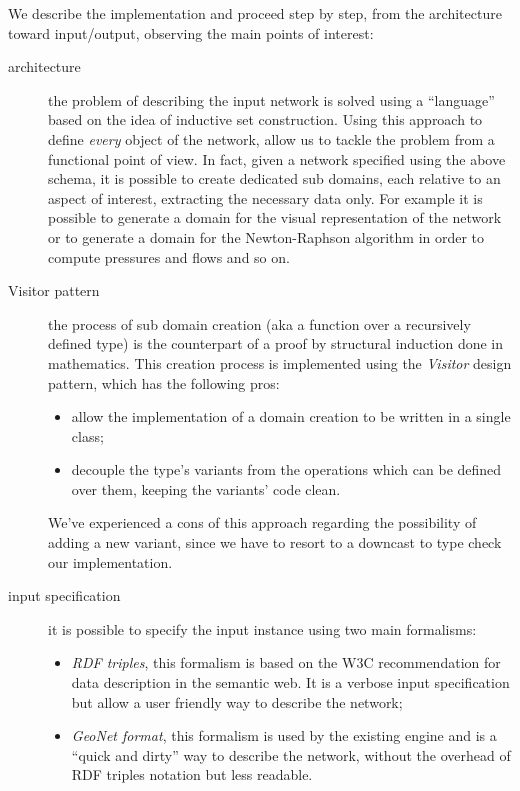 \documentclass[twoside,openright,titlepage,fleqn,
headinclude,11pt,a4paper,BCOR5mm,footinclude ]{scrbook}
\begin{document}
We describe the implementation and proceed step by step, from the architecture
toward input/output, observing the main points of interest:
\begin{description}
\item[architecture] the problem of describing the input network is solved using
a ``language'' based on the idea of inductive set construction. 
Using this approach to define \emph{every} object of the network,
allow us to tackle the problem from a functional point of view. In fact, given a
network specified using the above schema, it is possible to create dedicated
sub domains, each relative to an aspect of interest, extracting the
necessary data only. For example it
is possible to generate a domain for the visual representation of the network or
to generate a domain for the Newton-Raphson algorithm in order to compute
pressures and flows and so on.

\item[Visitor pattern]
the process of sub domain creation (aka a function over a recursively defined
type) is the counterpart of a proof by structural
induction done in mathematics. This creation process is implemented using the
\emph{Visitor} design pattern, which has the following pros:
\begin{itemize}
	\item allow the implementation of a domain creation to be written in a
		single class;
	\item decouple the type's variants from the operations which can be 
		defined over them, keeping the variants' code clean.
\end{itemize}
We've experienced a cons of this approach regarding the possibility of adding a
new variant, since we have to resort to a downcast to type check our implementation.

\item[input specification] it is possible to specify the input instance using
two main formalisms:
\begin{itemize}
	\item \emph{RDF triples}, this formalism is based on the W3C
		recommendation for data description in the semantic web. It is a
		verbose input specification but allow a user friendly way to
		describe the network;
	\item \emph{GeoNet format}, this formalism is used by the existing
		engine and is a ``quick and dirty'' way to describe the network,
		without the overhead of RDF triples notation but less
		readable.
\end{itemize}


\end{description}
\end{document}
